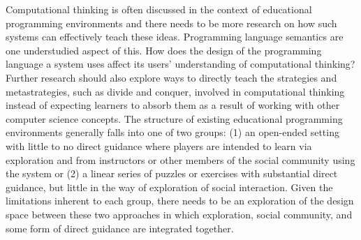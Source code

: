 \documentclass{sig-alternate}
\begin{document}

Computational thinking is often discussed in the context of educational programming environments and there needs to be more research on how such systems can effectively teach these ideas. 
Programming language semantics are one understudied aspect of this. 
How does the design of the programming language a system uses affect its users' understanding of computational thinking?
Further research should also explore ways to directly teach the strategies and metastrategies, such as divide and conquer, involved in computational thinking instead of expecting learners to absorb them as a result of working with other computer science concepts.
The structure of existing educational programming environments generally falls into one of two groups: (1) an open-ended setting with little to no direct guidance where players are intended to learn via exploration and from instructors or other members of the social community using the system or (2) a linear series of puzzles or exercises with substantial direct guidance, but little in the way of exploration of social interaction. 
Given the limitations inherent to each group, there needs to be an exploration of the design space between these two approaches in which exploration, social community, and some form of direct guidance are integrated together. 
\end{document}
